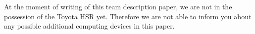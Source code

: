 At the moment of writing of this team description paper, we are not in the possession of the Toyota HSR yet. Therefore we are not able to inform you about any possible additional computing devices in this paper. 